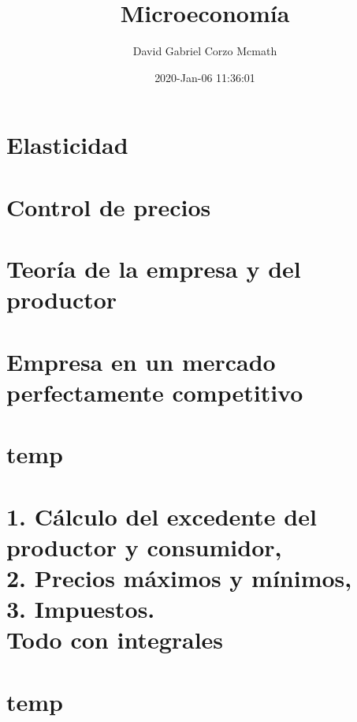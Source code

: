 \documentclass[openany]{book}
\title{Microeconomía}
\author{David Gabriel Corzo Mcmath}
\date{2020-Jan-06 11:36:01}
\begin{document}
\maketitle
\tableofcontents

\chapter{Elasticidad}



\chapter{Control de precios}




\chapter{Teoría de la empresa y del productor}



\chapter{Empresa en un mercado perfectamente competitivo}



\chapter{temp}


\chapter{1. Cálculo del excedente del productor y consumidor, \\2. Precios máximos y mínimos, \\ 3. Impuestos. \\ Todo con integrales}


\chapter{temp}

\end{document}
